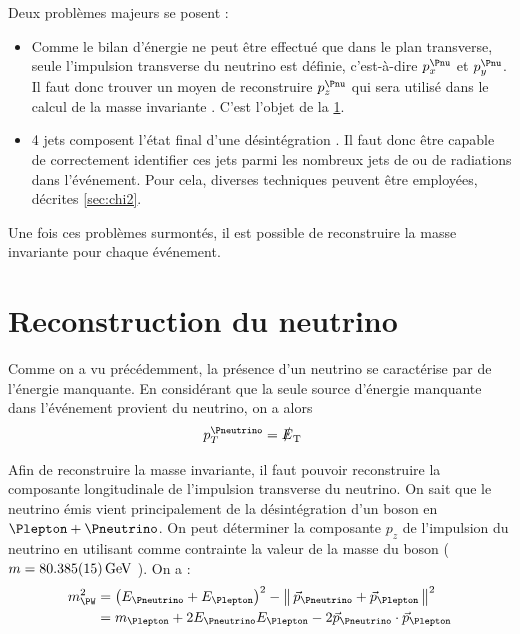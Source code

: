 Deux problèmes majeurs se posent :
\begin{itemize}
    \item Comme le bilan d'énergie ne peut être effectué que dans le plan transverse, seule l'impulsion transverse du neutrino est définie, c'est-à-dire $p_x^{\Pnu}$ et $p_y^{\Pnu}$. Il faut donc trouver un moyen de reconstruire $p_z^{\Pnu}$ qui sera utilisé dans le calcul de la masse invariante \ttbar. C'est l'objet de la \cref{sec:neutrino}.
    \item 4 jets composent l'état final d'une désintégration \ttbar. Il faut donc être capable de correctement identifier ces jets parmi les nombreux jets de \pu ou de radiations dans l'événement. Pour cela, diverses techniques peuvent être employées, décrites \cref{sec:chi2}.
\end{itemize}

Une fois ces problèmes surmontés, il est possible de reconstruire la masse invariante pour chaque événement.

\section{Reconstruction du neutrino} \label{sec:neutrino}

Comme on a vu précédemment, la présence d'un neutrino se caractérise par de l'énergie manquante. En considérant que la seule source d'énergie manquante dans l'événement provient du neutrino, on a alors
\begin{align*}
  p_T^{\Pneutrino} &= \met
\end{align*}

Afin de reconstruire la masse invariante, il faut pouvoir reconstruire la composante longitudinale de l'impulsion transverse du neutrino. On sait que le neutrino émis vient principalement de la désintégration d'un boson \PW en $\Plepton + \Pneutrino$. On peut déterminer la composante $p_z$ de l'impulsion du neutrino en utilisant comme contrainte la valeur de la masse du boson \PW ($m = \SI{80.385 \pm 0.015}{\GeV}$ \citep{pdg}). On a :
\begin{align*}
  m_{\PW}^2 &= \left( E_{\Pneutrino} + E_{\Plepton} \right)^2 - \norm{ \vec{p}_{\Pneutrino} + \vec{p}_{\Plepton} }^2 \\
  &= m_{\Plepton} + 2E_{\Pneutrino}E_{\Plepton} - 2 \vec{p}_{\Pneutrino} \cdot \vec{p}_{\Plepton}
\end{align*}

